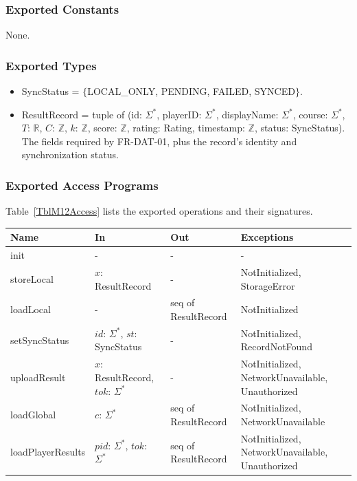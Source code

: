 \documentclass[12pt, titlepage]{article}
\begin{document}
\subsubsection{Exported Constants}

None.

\subsubsection{Exported Types}

\begin{itemize}
\item SyncStatus = $\{$LOCAL\_ONLY, PENDING, FAILED, SYNCED$\}$.
\item ResultRecord = tuple of (id: $\Sigma^*$, playerID: $\Sigma^*$,
  displayName: $\Sigma^*$, course: $\Sigma^*$, $T$: $\mathbb{R}$, $C$:
  $\mathbb{Z}$, $k$: $\mathbb{Z}$, score: $\mathbb{Z}$, rating: Rating,
  timestamp: $\mathbb{Z}$, status: SyncStatus). The fields required by
  FR-DAT-01, plus the record's identity and synchronization status.
\end{itemize}

\subsubsection{Exported Access Programs}

Table~\ref{TblM12Access} lists the exported operations and their signatures.

\begin{center}
\begin{minipage}{\textwidth}
\begin{tabularx}{\textwidth}{p{3.4cm} >{\raggedright\arraybackslash}p{3.4cm}
p{2.8cm} X}
\toprule
\textbf{Name} & \textbf{In} & \textbf{Out} & \textbf{Exceptions} \\
\midrule
init & - & - & - \\
storeLocal & $x$: ResultRecord & - & NotInitialized, StorageError \\
loadLocal & - & seq of ResultRecord & NotInitialized \\
setSyncStatus & $id$: $\Sigma^*$, $st$: SyncStatus & - & NotInitialized,
RecordNotFound \\
uploadResult & $x$: ResultRecord, $tok$: $\Sigma^*$ & - & NotInitialized,
NetworkUnavailable, Unauthorized \\
loadGlobal & $c$: $\Sigma^*$ & seq of ResultRecord & NotInitialized,
NetworkUnavailable \\
loadPlayerResults & $pid$: $\Sigma^*$, $tok$: $\Sigma^*$ & seq of ResultRecord &
NotInitialized, NetworkUnavailable, Unauthorized \\
\bottomrule
\end{tabularx}
\label{TblM12Access}
\end{minipage}
\end{center}
\end{document}
